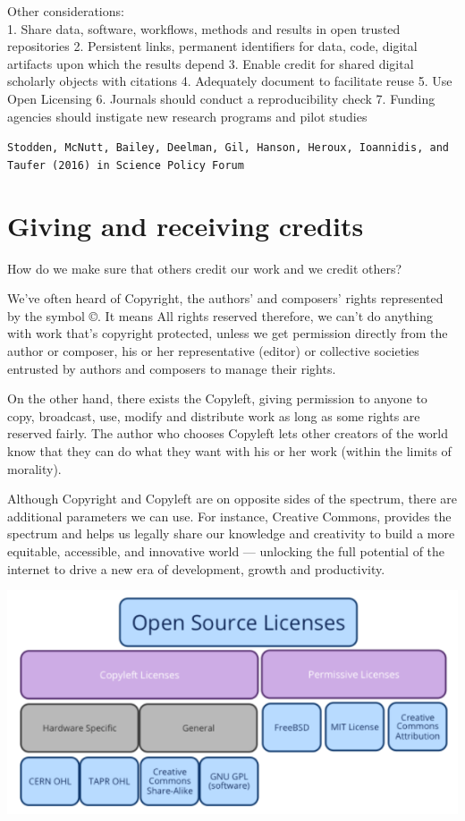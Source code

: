 \documentclass[
]{book}
\begin{document}
Other considerations:\\
1. Share data, software, workflows, methods and results in open trusted repositories
2. Persistent links, permanent identifiers for data, code, digital artifacts upon which the results depend
3. Enable credit for shared digital scholarly objects with citations
4. Adequately document to facilitate reuse
5. Use Open Licensing
6. Journals should conduct a reproducibility check
7. Funding agencies should instigate new research programs and pilot studies

\texttt{Stodden,\ McNutt,\ Bailey,\ Deelman,\ Gil,\ Hanson,\ Heroux,\ Ioannidis,\ and\ Taufer\ (2016)\ in\ Science\ Policy\ Forum}

\hypertarget{giving-and-receiving-credits}{%
\chapter{Giving and receiving credits}\label{giving-and-receiving-credits}}

How do we make sure that others credit our work and we credit others?

We've often heard of Copyright, the authors' and composers' rights represented by the symbol ©.
It means All rights reserved therefore, we can't do anything with work that's copyright protected, unless we get permission directly from the author or composer, his or her representative (editor) or collective societies entrusted by authors and composers to manage their rights.

On the other hand, there exists the Copyleft, giving permission to anyone to copy, broadcast, use, modify and distribute work as long as some rights are reserved fairly. The author who chooses Copyleft lets other creators of the world know that they can do what they want with his or her work (within the limits of morality).

Although Copyright and Copyleft are on opposite sides of the spectrum, there are additional parameters we can use. For instance, Creative Commons, provides the spectrum and helps us legally share our knowledge and creativity to build a more equitable, accessible, and innovative world --- unlocking the full potential of the internet to drive a new era of development, growth and productivity.

\includegraphics{rr-presentation-figure/rightleft.png}
\end{document}
